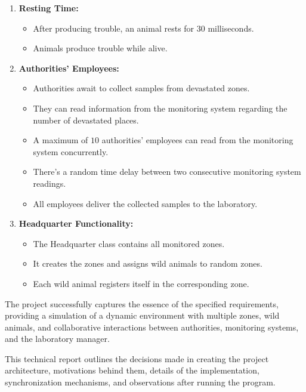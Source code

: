 \documentclass{article}
\begin{document}
\begin{enumerate}
\begin{itemize}
    \end{itemize}
    \item \textbf{Resting Time:}
    \begin{itemize}
        \item After producing trouble, an animal rests for $30$ milliseconds.
        \item Animals produce trouble while alive.
    \end{itemize}
    \item \textbf{Authorities’ Employees:}
    \begin{itemize}
        \item Authorities await to collect samples from devastated zones.
        \item They can read information from the monitoring system regarding the number of devastated places.
        \item A maximum of $10$ authorities' employees can read from the monitoring system concurrently.
        \item There's a random time delay between two consecutive monitoring system readings.
        \item All employees deliver the collected samples to the laboratory.
    \end{itemize}
    \item \textbf{Headquarter Functionality:}
    \begin{itemize}
        \item The Headquarter class contains all monitored zones.
        \item It creates the zones and assigns wild animals to random zones.
        \item Each wild animal registers itself in the corresponding zone.
    \end{itemize}
\end{enumerate}

The project successfully captures the essence of the specified requirements, providing a simulation of a dynamic environment with multiple zones, wild animals, and collaborative interactions between authorities, monitoring systems, and the laboratory manager.

This technical report outlines the decisions made in creating the project architecture, motivations behind them, details of the implementation, synchronization mechanisms, and observations after running the program.
\end{document}
